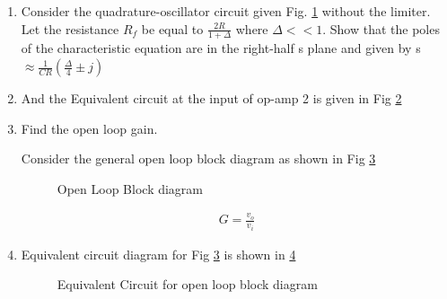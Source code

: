 \begin{enumerate}[label=\thesubsection.\arabic*.,ref=\thesubsection.\theenumi]
\item
Consider the quadrature-oscillator circuit given Fig. \ref{fig:es17btech11009_fig1} without the limiter. Let the resistance $R_{f}$ be equal to $\frac{2R}{1 + \Delta}$ where $\Delta << 1$. Show that the poles of the characteristic equation are in the right-half s plane and given by 
s $\approx \frac{1}{CR}(\frac{\Delta}{4}\pm j)$
\renewcommand{\thefigure}{\theenumi.\arabic{figure}}
\begin{figure}[!ht]
	\begin{center}
		\resizebox{\columnwidth}{!}{}
	\end{center}
\caption{}
\label{fig:es17btech11009_fig1}
\end{figure}
\item
And the Equivalent circuit at the input of op-amp 2 is given in Fig \ref{fig:es17btech11009_fig2}
\renewcommand{\thefigure}{\theenumi.\arabic{figure}}
\begin{figure}[!ht]
	\begin{center}
		\resizebox{\columnwidth}{!}{}
	\end{center}
\caption{}
\label{fig:es17btech11009_fig2}
\end{figure}
\item 
\solution Find the open loop gain.

Consider the general open loop block diagram as shown in Fig \ref{fig:es17btech11009_block1}
\renewcommand{\thefigure}{\theenumi.\arabic{figure}}
\begin{figure}[!ht]
	\begin{center}
		\resizebox{\columnwidth}{!}{}
	\end{center}
\caption{Open Loop Block diagram}
\label{fig:es17btech11009_block1}
\end{figure}
\begin{align}
    G = \frac{v_{o}}{v_i} 
\end{align}
\item
Equivalent circuit diagram for Fig \ref{fig:es17btech11009_block1} is shown in \ref{fig:es17btech11009_block2}
\renewcommand{\thefigure}{\theenumi.\arabic{figure}}
\begin{figure}[!ht]
	\begin{center}
		\resizebox{\columnwidth}{!}{}
	\end{center}
\caption{Equivalent Circuit for open loop block diagram}
\label{fig:es17btech11009_block2}
\end{figure}


\end{enumerate}
